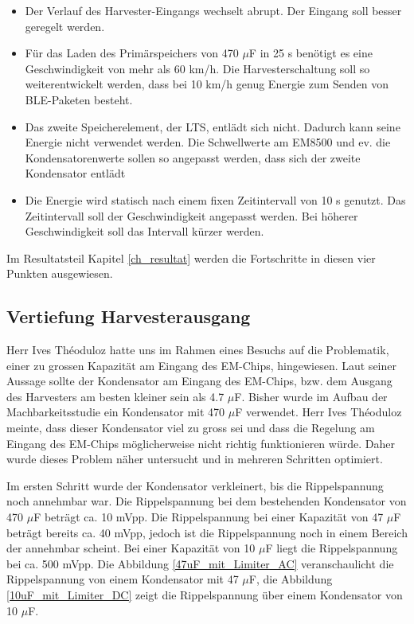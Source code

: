 \begin{minipage}{1\textwidth}
\begin{itemize}
     \item Der Verlauf des Harvester-Eingangs wechselt abrupt. Der Eingang soll besser geregelt werden. 
     \item Für das Laden des Primärspeichers von 470 $\mu$F in 25 s benötigt es eine Geschwindigkeit von mehr als 60 km/h.  Die Harvesterschaltung soll so weiterentwickelt werden, dass bei 10 km/h genug Energie zum Senden von BLE-Paketen besteht.    
     \item Das zweite Speicherelement, der LTS, entlädt sich nicht. Dadurch kann seine Energie nicht verwendet werden. Die Schwellwerte am EM8500 und ev. die Kondensatorenwerte sollen so angepasst werden, dass sich der zweite Kondensator entlädt
     \item Die Energie wird statisch nach einem fixen Zeitintervall von 10 s genutzt. Das Zeitintervall soll der Geschwindigkeit angepasst werden. Bei höherer Geschwindigkeit soll das Intervall kürzer werden.
\end{itemize} 
\end{minipage}

Im Resultatsteil Kapitel \ref{ch_resultat} werden die Fortschritte in diesen vier Punkten ausgewiesen.

\subsection{Vertiefung Harvesterausgang}\label{auffaellig} 

Herr Ives Théoduloz hatte uns im Rahmen eines Besuchs auf die Problematik, einer zu grossen Kapazität am Eingang des EM-Chips, hingewiesen. Laut seiner Aussage sollte der Kondensator am Eingang des EM-Chips, bzw. dem Ausgang des Harvesters am besten kleiner sein als 4.7 $\mu$F. Bisher wurde im Aufbau der Machbarkeitsstudie ein Kondensator mit 470 $\mu$F verwendet. Herr Ives Théoduloz meinte, dass dieser Kondensator viel zu gross sei und dass die Regelung am Eingang des EM-Chips möglicherweise nicht richtig funktionieren würde. Daher wurde dieses Problem näher untersucht und in mehreren Schritten optimiert.

Im ersten Schritt wurde der Kondensator verkleinert, bis die Rippelspannung noch annehmbar war. Die Rippelspannung bei dem bestehenden Kondensator von 470 $\mu$F beträgt ca. 10 mVpp. Die Rippelspannung bei einer Kapazität von 47 $\mu$F beträgt bereits ca. 40 mVpp, jedoch ist die Rippelspannung noch in einem Bereich der annehmbar scheint. Bei einer Kapazität von 10 $\mu$F liegt die Rippelspannung bei ca. 500 mVpp. Die Abbildung \ref{47uF_mit_Limiter_AC} veranschaulicht die Rippelspannung von einem Kondensator mit 47 $\mu$F, die Abbildung \ref{10uF_mit_Limiter_DC} zeigt die Rippelspannung über einem Kondensator von 10 $\mu$F.

